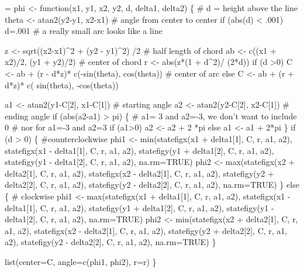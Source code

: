 \documentclass{article}
\begin{document}
\begin{nwchunk}
=
 phi <- function(x1, y1, x2, y2, d, delta1, delta2) \{
     # d = height above the line
     theta <- atan2(y2-y1, x2-x1)    # angle from center to center
     if (abs(d) < .001) d=.001       # a really small arc looks like a line
 
     z <- sqrt((x2-x1)^2 + (y2 - y1)^2) /2 # half length of chord
     ab <- c((x1 + x2)/2, (y1 + y2)/2)      # center of chord
     r  <- abs(z*(1 + d^2)/ (2*d))
     if (d >0) C  <- ab + (r - d*z)* c(-sin(theta), cos(theta)) # center of arc
     else      C  <- ab + (r + d*z)* c( sin(theta), -cos(theta))
 
     a1 <- atan2(y1-C[2], x1-C[1])   # starting angle
     a2 <- atan2(y2-C[2], x2-C[1])   # ending angle
     if (abs(a2-a1) > pi) \{
         # a1= 3 and a2=-3, we don't want to include 0
         # nor for a1=-3 and a2=3
         if (a1>0) a2 <- a2 + 2 *pi 
         else a1 <- a1 + 2*pi
     \}
     if (d > 0) \{ #counterclockwise
         phi1 <- min(statefigx(x1 + delta1[1], C, r, a1, a2),
                     statefigx(x1 - delta1[1], C, r, a1, a2),
                     statefigy(y1 + delta1[2], C, r, a1, a2),
                     statefigy(y1 - delta1[2], C, r, a1, a2), na.rm=TRUE)
         phi2 <- max(statefigx(x2 + delta2[1], C, r, a1, a2),
                     statefigx(x2 - delta2[1], C, r, a1, a2),
                     statefigy(y2 + delta2[2], C, r, a1, a2),
                     statefigy(y2 - delta2[2], C, r, a1, a2), na.rm=TRUE)
     \}
     else \{ # clockwise
         phi1 <- max(statefigx(x1 + delta1[1], C, r, a1, a2),
                     statefigx(x1 - delta1[1], C, r, a1, a2),
                     statefigy(y1 + delta1[2], C, r, a1, a2),
                     statefigy(y1 - delta1[2], C, r, a1, a2), na.rm=TRUE)
         phi2 <- min(statefigx(x2 + delta2[1], C, r, a1, a2),
                     statefigx(x2 - delta2[1], C, r, a1, a2),
                     statefigy(y2 + delta2[2], C, r, a1, a2),
                     statefigy(y2 - delta2[2], C, r, a1, a2), na.rm=TRUE)
     \}
 
     list(center=C, angle=c(phi1, phi2), r=r)
 \}
\end{nwchunk}
\end{document}
